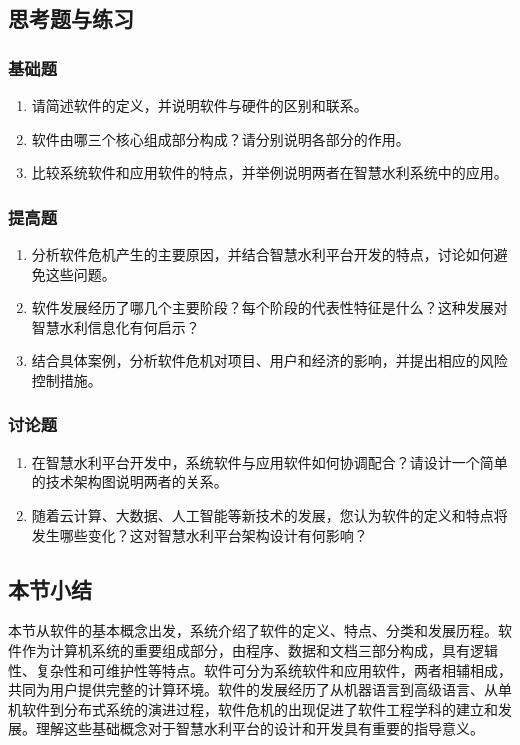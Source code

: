\subsection{思考题与练习}\label{ux601dux8003ux9898ux4e0eux7ec3ux4e60} \subsubsection{基础题}\label{ux57faux7840ux9898}
\begin{enumerate} \def\labelenumi{\arabic{enumi}.} \tightlist \item 请简述软件的定义，并说明软件与硬件的区别和联系。 \item
软件由哪三个核心组成部分构成？请分别说明各部分的作用。 \item 比较系统软件和应用软件的特点，并举例说明两者在智慧水利系统中的应用。 \end{enumerate}
\subsubsection{提高题}\label{ux63d0ux9ad8ux9898} \begin{enumerate} \def\labelenumi{\arabic{enumi}.} \tightlist \item
分析软件危机产生的主要原因，并结合智慧水利平台开发的特点，讨论如何避免这些问题。 \item 软件发展经历了哪几个主要阶段？每个阶段的代表性特征是什么？这种发展对智慧水利信息化有何启示？ \item
结合具体案例，分析软件危机对项目、用户和经济的影响，并提出相应的风险控制措施。 \end{enumerate} \subsubsection{讨论题}\label{ux8ba8ux8bbaux9898} \begin{enumerate}
\def\labelenumi{\arabic{enumi}.} \tightlist \item 在智慧水利平台开发中，系统软件与应用软件如何协调配合？请设计一个简单的技术架构图说明两者的关系。 \item
随着云计算、大数据、人工智能等新技术的发展，您认为软件的定义和特点将发生哪些变化？这对智慧水利平台架构设计有何影响？ \end{enumerate}
\subsection{本节小结}\label{ux672cux8282ux5c0fux7ed3}
本节从软件的基本概念出发，系统介绍了软件的定义、特点、分类和发展历程。软件作为计算机系统的重要组成部分，由程序、数据和文档三部分构成，具有逻辑性、复杂性和可维护性等特点。软件可分为系统软件和应用软件，两者相辅相成，共同为用户提供完整的计算环境。软件的发展经历了从机器语言到高级语言、从单机软件到分布式系统的演进过程，软件危机的出现促进了软件工程学科的建立和发展。理解这些基础概念对于智慧水利平台的设计和开发具有重要的指导意义。
